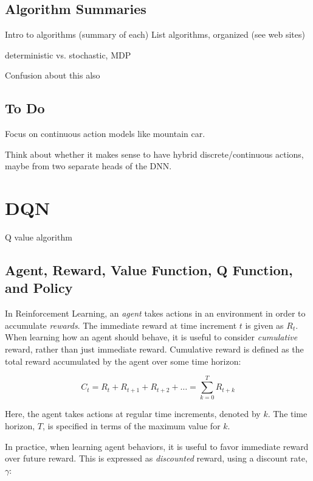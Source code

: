 \documentclass[acmlarge,screen]{acmart}
\begin{document}
\subsection{Algorithm Summaries}


Intro to algorithms (summary of each)
List algorithms, organized (see web sites)






deterministic vs. stochastic, MDP

Confusion about this also






\subsection{To Do}

Focus on continuous action models like mountain car.

Think about whether it makes sense to have hybrid discrete/continuous actions, maybe
from two separate heads of the DNN.



\section{DQN}

Q value algorithm


\subsection{Agent, Reward, Value Function, Q Function, and Policy}

In Reinforcement Learning, an \textit{agent} takes actions in an environment in order to accumulate \textit{rewards}.
The immediate reward at time increment $t$ is given as $R_t$.
When learning how an agent should behave, it is useful to consider \textit{cumulative} reward, 
rather than just immediate reward.
Cumulative reward is defined as the total reward accumulated by the agent over some time horizon:

\begin{equation}
  C_t = R_t + R_{t+1} + R_{t+2} + \ldots = \sum_{k=0}^T R_{t+k} 
\end{equation}

Here, the agent takes actions at regular time increments, denoted by $k$.  
The time horizon, $T$, is specified in terms of the maximum value for $k$.

In practice, when learning agent behaviors, it is useful to favor immediate reward over future reward. 
This is expressed as \textit{discounted} reward, using a discount rate, $\gamma$:
  
\end{document}
